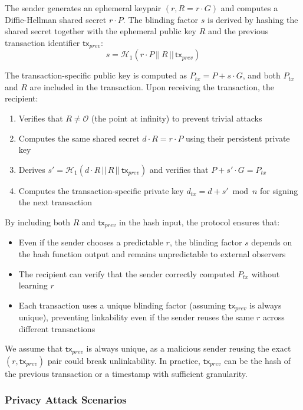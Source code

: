 \documentclass{article}
\begin{document}
The sender generates an ephemeral keypair $(r, R = r \cdot G)$ and computes a Diffie-Hellman shared secret $r \cdot P$. The blinding factor $s$ is derived by hashing the shared secret together with the ephemeral public key $R$ and the previous transaction identifier $\mathsf{tx}_{prev}$:
$$s = \mathcal{H}_1(r \cdot P \,||\, R \,||\, \mathsf{tx}_{prev})$$

The transaction-specific public key is computed as $P_{tx} = P + s \cdot G$, and both $P_{tx}$ and $R$ are included in the transaction. Upon receiving the transaction, the recipient:
\begin{enumerate}
\item Verifies that $R \neq \mathcal{O}$ (the point at infinity) to prevent trivial attacks
\item Computes the same shared secret $d \cdot R = r \cdot P$ using their persistent private key
\item Derives $s' = \mathcal{H}_1(d \cdot R \,||\, R \,||\, \mathsf{tx}_{prev})$ and verifies that $P + s' \cdot G = P_{tx}$
\item Computes the transaction-specific private key $d_{tx} = d + s' \bmod n$ for signing the next transaction
\end{enumerate}

By including both $R$ and $\mathsf{tx}_{prev}$ in the hash input, the protocol ensures that:
\begin{itemize}
\item Even if the sender chooses a predictable $r$, the blinding factor $s$ depends on the hash function output and remains unpredictable to external observers
\item The recipient can verify that the sender correctly computed $P_{tx}$ without learning $r$
\item Each transaction uses a unique blinding factor (assuming $\mathsf{tx}_{prev}$ is always unique), preventing linkability even if the sender reuses the same $r$ across different transactions
\end{itemize}

We assume that $\mathsf{tx}_{prev}$ is always unique, as a malicious sender reusing the exact $(r, \mathsf{tx}_{prev})$ pair could break unlinkability. In practice, $\mathsf{tx}_{prev}$ can be the hash of the previous transaction or a timestamp with sufficient granularity.


\subsubsection{Privacy Attack Scenarios}
\end{document}
